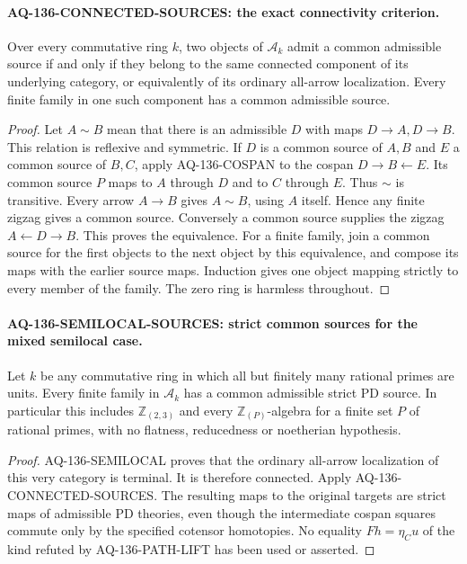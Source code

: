 \paragraph{AQ-136-CONNECTED-SOURCES: the exact connectivity criterion.}
Over every commutative ring $k$, two objects of $\mathcal A_k$
admit a common admissible source if and only if they belong
to the same connected component of its underlying category,
or equivalently of its ordinary all-arrow localization.
Every finite family in one such component has a common
admissible source.

\begin{proof}
Let $A\sim B$ mean that there is an admissible $D$ with
maps $D\to A,D\to B$. This relation is reflexive and
symmetric. If $D$ is a common source of $A,B$ and $E$ a
common source of $B,C$, apply AQ-136-COSPAN to the cospan
$D\to B\leftarrow E$. Its common source $P$ maps to
$A$ through $D$ and to $C$ through $E$. Thus $\sim$ is
transitive. Every arrow $A\to B$ gives $A\sim B$, using
$A$ itself. Hence any finite zigzag gives a common source.
Conversely a common source supplies the zigzag
$A\leftarrow D\to B$. This proves the equivalence.
For a finite family, join a common source for the first
objects to the next object by this equivalence, and compose
its maps with the earlier source maps. Induction gives
one object mapping strictly to every member of the family.
The zero ring is harmless throughout.
\end{proof}

\paragraph{AQ-136-SEMILOCAL-SOURCES: strict common sources for the mixed semilocal case.}
Let $k$ be any commutative ring in which all but finitely
many rational primes are units. Every finite family in
$\mathcal A_k$ has a common admissible strict PD source.
In particular this includes $\mathbb Z_{(2,3)}$ and
every $\mathbb Z_{(P)}$-algebra for a finite set $P$ of
rational primes, with no flatness, reducedness or noetherian
hypothesis.

\begin{proof}
AQ-136-SEMILOCAL proves that the ordinary all-arrow
localization of this very category is terminal. It is
therefore connected. Apply AQ-136-CONNECTED-SOURCES.
The resulting maps to the original targets are strict
maps of admissible PD theories, even though the intermediate
cospan squares commute only by the specified cotensor
homotopies. No equality $Fh=\eta_Cu$ of the kind refuted
by AQ-136-PATH-LIFT has been used or asserted.
\end{proof}

